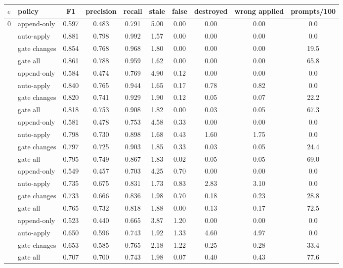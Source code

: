 \begin{tabular}{llcccccccc}
\toprule
$e$ & policy & F1 & precision & recall & stale & false & destroyed & wrong applied & prompts/100 \\
\midrule
0 & append-only & 0.597 & 0.483 & 0.791 & 5.00 & 0.00 & 0.00 & 0.00 & 0.0 \\
 & auto-apply & 0.881 & 0.798 & 0.992 & 1.57 & 0.00 & 0.00 & 0.00 & 0.0 \\
 & gate changes & 0.854 & 0.768 & 0.968 & 1.80 & 0.00 & 0.00 & 0.00 & 19.5 \\
 & gate all & 0.861 & 0.788 & 0.959 & 1.62 & 0.00 & 0.00 & 0.00 & 65.8 \\
\addlinespace[2pt]
0.05 & append-only & 0.584 & 0.474 & 0.769 & 4.90 & 0.12 & 0.00 & 0.00 & 0.0 \\
 & auto-apply & 0.840 & 0.765 & 0.944 & 1.65 & 0.17 & 0.78 & 0.82 & 0.0 \\
 & gate changes & 0.820 & 0.741 & 0.929 & 1.90 & 0.12 & 0.05 & 0.07 & 22.2 \\
 & gate all & 0.818 & 0.753 & 0.908 & 1.82 & 0.00 & 0.03 & 0.05 & 67.3 \\
\addlinespace[2pt]
0.1 & append-only & 0.581 & 0.478 & 0.753 & 4.58 & 0.33 & 0.00 & 0.00 & 0.0 \\
 & auto-apply & 0.798 & 0.730 & 0.898 & 1.68 & 0.43 & 1.60 & 1.75 & 0.0 \\
 & gate changes & 0.797 & 0.725 & 0.903 & 1.85 & 0.33 & 0.03 & 0.05 & 24.4 \\
 & gate all & 0.795 & 0.749 & 0.867 & 1.83 & 0.02 & 0.05 & 0.05 & 69.0 \\
\addlinespace[2pt]
0.2 & append-only & 0.549 & 0.457 & 0.703 & 4.25 & 0.70 & 0.00 & 0.00 & 0.0 \\
 & auto-apply & 0.735 & 0.675 & 0.831 & 1.73 & 0.83 & 2.83 & 3.10 & 0.0 \\
 & gate changes & 0.733 & 0.666 & 0.836 & 1.98 & 0.70 & 0.18 & 0.23 & 28.8 \\
 & gate all & 0.765 & 0.732 & 0.818 & 1.88 & 0.00 & 0.13 & 0.17 & 72.5 \\
\addlinespace[2pt]
0.3 & append-only & 0.523 & 0.440 & 0.665 & 3.87 & 1.20 & 0.00 & 0.00 & 0.0 \\
 & auto-apply & 0.650 & 0.596 & 0.743 & 1.92 & 1.33 & 4.60 & 4.97 & 0.0 \\
 & gate changes & 0.653 & 0.585 & 0.765 & 2.18 & 1.22 & 0.25 & 0.28 & 33.4 \\
 & gate all & 0.707 & 0.700 & 0.743 & 1.98 & 0.07 & 0.40 & 0.43 & 77.6 \\
\bottomrule
\end{tabular}
